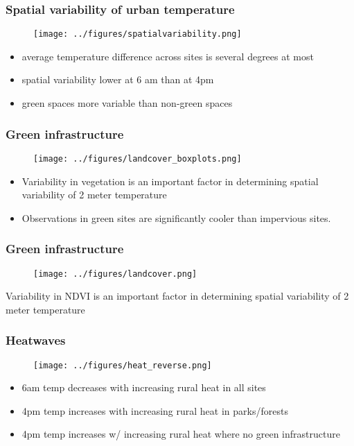 \documentclass[aspectratio=169, 10pt]{beamer}
\begin{document}
\begin{frame}
\frametitle{Spatial variability of urban temperature}
\begin{figure}
\texttt{[image: ../figures/spatialvariability.png]}
\end{figure}
\begin{itemize}
\item average temperature difference across sites is several degrees at most
\item spatial variability lower at 6 am than at 4pm
\item green spaces more variable than non-green spaces 
\end{itemize}
\end{frame}

\begin{frame}
\frametitle{Green infrastructure}
\begin{figure}
\texttt{[image: ../figures/landcover\_boxplots.png]}
\end{figure}

\begin{itemize}
\item Variability in vegetation is an important factor in determining spatial variability of 2 meter temperature
\item Observations in green sites are significantly cooler than impervious sites.
\end{itemize}
\end{frame}

\begin{frame}
\frametitle{Green infrastructure}
\begin{figure}
\texttt{[image: ../figures/landcover.png]}
\end{figure}
Variability in NDVI is an important factor in determining spatial variability of 2 meter temperature
\end{frame}

\begin{frame}
\frametitle{Heatwaves}
\begin{figure}
\texttt{[image: ../figures/heat\_reverse.png]}
\end{figure}
\begin{itemize}
\item 6am temp decreases with increasing rural heat in all sites
\item 4pm temp increases with increasing rural heat in parks/forests
\item 4pm temp increases w/ increasing rural heat  where no green infrastructure 
\end{itemize}
\end{frame}
\end{document}
